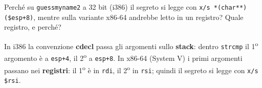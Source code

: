 \question[5]
Perché su \lstinline|guessmyname2| a 32 bit (i386) il segreto si legge con \lstinline|x/s *(char**)($esp+8)|, mentre sulla variante x86-64 andrebbe letto in un registro? Quale registro, e perché?
\begin{solution}
In i386 la convenzione \textbf{cdecl} passa gli argomenti sullo \textbf{stack}: dentro \lstinline|strcmp| il 1\textsuperscript{o} argomento è a \lstinline|esp+4|, il 2\textsuperscript{o} a \lstinline|esp+8|.
In x86-64 (System V) i primi argomenti passano nei \textbf{registri}: il 1\textsuperscript{o} è in \lstinline|rdi|, il 2\textsuperscript{o} in \lstinline|rsi|; quindi il segreto si legge con \lstinline|x/s $rsi|.
\end{solution}
